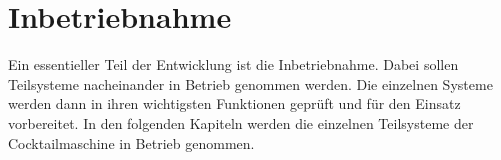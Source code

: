 \section{Inbetriebnahme}
\label{sec:Inbetriebnahme}

Ein essentieller Teil der Entwicklung ist die Inbetriebnahme. Dabei sollen Teilsysteme nacheinander in Betrieb genommen werden. Die einzelnen Systeme werden dann in ihren wichtigsten Funktionen geprüft und für den Einsatz vorbereitet. In den folgenden Kapiteln werden die einzelnen Teilsysteme der Cocktailmaschine in Betrieb genommen. 